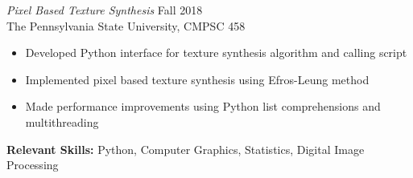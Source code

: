 \documentclass[line,margin]{res}
\begin{document}
\begin{resume}
		{\sl Pixel Based Texture Synthesis} \hfill Fall 2018\\
		The Pennsylvania State University, CMPSC 458
		\begin{itemize}  \itemsep -2pt
			\item Developed Python interface for texture synthesis algorithm and calling script
			\item Implemented pixel based texture synthesis using Efros-Leung method
			\item Made performance improvements using Python list comprehensions and multithreading
			\vspace*{-\baselineskip}		
		\end{itemize}
		\textbf{Relevant Skills:} Python, Computer Graphics, Statistics, Digital Image Processing

	\end{resume}
\end{document}
